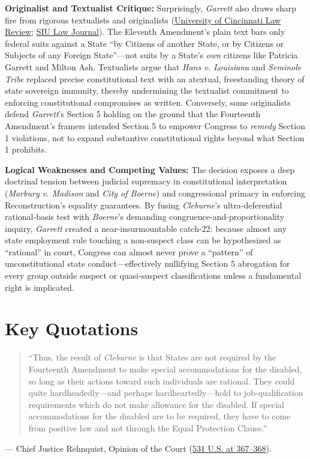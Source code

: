 \documentclass[12pt]{article}
\begin{document}
\textbf{Originalist and Textualist Critique:} Surprisingly, \textit{Garrett} also draws sharp fire from rigorous textualists and originalists (\href{https://scholarship.law.uc.edu/cgi/viewcontent.cgi?article=1475&context=uclr}{University of Cincinnati Law Review}; \href{https://law.siu.edu/_common/documents/law-journal/articles-2016/fall-2016/6-sample-article-sm.pdf}{SIU Law Journal}). The Eleventh Amendment's plain text bars only federal suits against a State ``by Citizens of another State, or by Citizens or Subjects of any Foreign State''---not suits by a State's \textit{own} citizens like Patricia Garrett and Milton Ash. Textualists argue that \textit{Hans v. Louisiana} and \textit{Seminole Tribe} replaced precise constitutional text with an atextual, freestanding theory of state sovereign immunity, thereby undermining the textualist commitment to enforcing constitutional compromises as written. Conversely, some originalists defend \textit{Garrett}'s Section 5 holding on the ground that the Fourteenth Amendment's framers intended Section 5 to empower Congress to \textit{remedy} Section 1 violations, not to expand substantive constitutional rights beyond what Section 1 prohibits.

\textbf{Logical Weaknesses and Competing Values:} The decision exposes a deep doctrinal tension between judicial supremacy in constitutional interpretation (\textit{Marbury v. Madison} and \textit{City of Boerne}) and congressional primacy in enforcing Reconstruction's equality guarantees. By fusing \textit{Cleburne}'s ultra-deferential rational-basis test with \textit{Boerne}'s demanding congruence-and-proportionality inquiry, \textit{Garrett} created a near-insurmountable catch-22: because almost any state employment rule touching a non-suspect class can be hypothesized as ``rational'' in court, Congress can almost never prove a ``pattern'' of unconstitutional state conduct---effectively nullifying Section 5 abrogation for every group outside suspect or quasi-suspect classifications unless a fundamental right is implicated.

\section{Key Quotations}

\begin{quote}
``Thus, the result of \textit{Cleburne} is that States are not required by the Fourteenth Amendment to make special accommodations for the disabled, so long as their actions toward such individuals are rational. They could quite hardheadedly---and perhaps hardheartedly---hold to job-qualification requirements which do not make allowance for the disabled. If special accommodations for the disabled are to be required, they have to come from positive law and not through the Equal Protection Clause.''
\end{quote}
\noindent --- Chief Justice Rehnquist, Opinion of the Court (\href{https://supreme.justia.com/cases/federal/us/531/356/}{531 U.S. at 367--368}).
\end{document}
